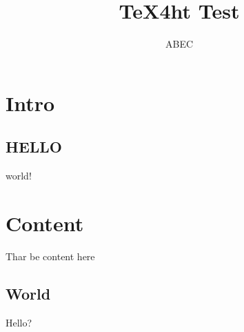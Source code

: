 \documentclass{book}
\title{TeX4ht Test}
\author{ABEC}
\begin{document}
\maketitle

\ifdefined\HCode\else\tableofcontents\fi

\section{Intro}
\subsection{HELLO}
world!

\section{Content}
Thar be content here
\subsection{World}
Hello?
\end{document}
